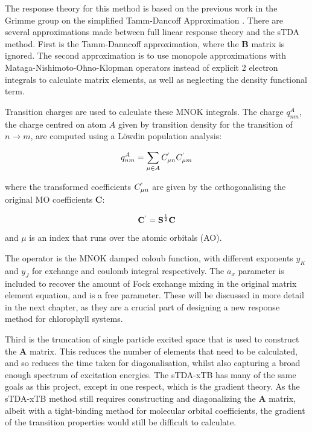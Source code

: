 The response theory for this method is based on the previous work in the Grimme 
group on the simplified Tamm-Dancoff Approximation \cite{Grimme2013}.
There are several approximations made between full linear response theory and
the sTDA method. First is the Tamm-Danncoff approximation, where the $\mathbf{B}$
matrix is ignored. The second approximation is to use monopole approximations with
Mataga-Nishimoto-Ohno-Klopman operators instead of explicit 2 electron integrals
to calculate matrix elements, as well as neglecting the density functional term.

Transition charges are used to calculate these MNOK integrals. The charge $q^A_{nm}$,
the charge centred on atom $A$ given by transition density for the transition of
$ n \rightarrow m$, are computed using a Löwdin population analysis:

\begin{equation}
q_{nm}^A = \sum_{\mu \in A} C^`_{\mu n} C^`_{\mu m}
\end{equation}

where the transformed coefficients $C^`_{\mu n}$ are given by the orthogonalising
the original MO coefficients $\textbf{C}$:

\begin{equation}
\textbf{C}^` = \textbf{S}^{\frac{1}{2}} \textbf{C}
\end{equation}

and $\mu$ is an index that runs over the atomic orbitals (AO).

The operator is the 
MNOK\cite{Nishimoto1957}\cite{Ohno1964}\cite{Klopman1964} damped coloub function, 
with different exponents $y_K$ and $y_J$ for exchange and coulomb integral respectively. 
The $a_x$ parameter is included to recover the amount of Fock exchange mixing in
the original matrix element equation, and is a free parameter. These will be discussed
in more detail in the next chapter, as they are a crucial part of designing a new
response method for chlorophyll systems.

Third is the truncation of single particle excited space that is used to construct 
the $\mathbf{A}$ matrix. This reduces the number of elements that need to be 
calculated, and so reduces the time taken for diagonalisation, whilst also capturing 
a broad enough spectrum of excitation energies. The sTDA-xTB has many of the same 
goals as this project, except in one respect, which is the gradient theory. As 
the sTDA-xTB method still requires constructing and diagonalizing the $\mathbf{A}$ 
matrix, albeit with a tight-binding method for molecular orbital coefficients, 
the gradient of the transition properties would still be difficult to calculate.


